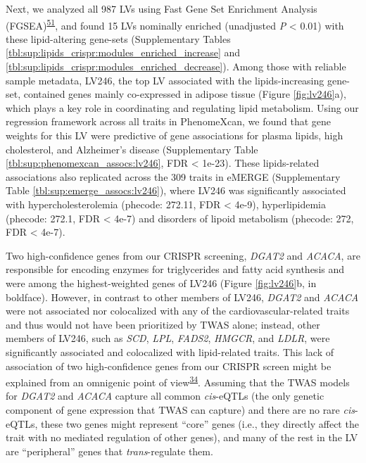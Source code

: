 \documentclass[
  a4paper,
]{article}
\begin{document}
Next, we analyzed all 987 LVs using Fast Gene Set Enrichment Analysis (FGSEA)\textsuperscript{\protect\hyperlink{ref-Z8WXLD67}{51}}, and found 15 LVs nominally enriched (unadjusted \emph{P} \textless{} 0.01) with these lipid-altering gene-sets (Supplementary Tables \ref{tbl:sup:lipids_crispr:modules_enriched_increase} and \ref{tbl:sup:lipids_crispr:modules_enriched_decrease}).
Among those with reliable sample metadata, LV246, the top LV associated with the lipids-increasing gene-set, contained genes mainly co-expressed in adipose tissue (Figure \ref{fig:lv246}a), which plays a key role in coordinating and regulating lipid metabolism.
Using our regression framework across all traits in PhenomeXcan, we found that gene weights for this LV were predictive of gene associations for plasma lipids, high cholesterol, and Alzheimer's disease (Supplementary Table \ref{tbl:sup:phenomexcan_assocs:lv246}, FDR \textless{} 1e-23).
These lipids-related associations also replicated across the 309 traits in eMERGE (Supplementary Table \ref{tbl:sup:emerge_assocs:lv246}), where LV246 was significantly associated with hypercholesterolemia (phecode: 272.11, FDR \textless{} 4e-9), hyperlipidemia (phecode: 272.1, FDR \textless{} 4e-7) and disorders of lipoid metabolism (phecode: 272, FDR \textless{} 4e-7).

Two high-confidence genes from our CRISPR screening, \emph{DGAT2} and \emph{ACACA}, are responsible for encoding enzymes for triglycerides and fatty acid synthesis and were among the highest-weighted genes of LV246 (Figure \ref{fig:lv246}b, in boldface).
However, in contrast to other members of LV246, \emph{DGAT2} and \emph{ACACA} were not associated nor colocalized with any of the cardiovascular-related traits and thus would not have been prioritized by TWAS alone;
instead, other members of LV246, such as \emph{SCD}, \emph{LPL}, \emph{FADS2}, \emph{HMGCR}, and \emph{LDLR}, were significantly associated and colocalized with lipid-related traits.
This lack of association of two high-confidence genes from our CRISPR screen might be explained from an omnigenic point of view\textsuperscript{\protect\hyperlink{ref-LXvTZzEA}{34}}.
Assuming that the TWAS models for \emph{DGAT2} and \emph{ACACA} capture all common \emph{cis}-eQTLs (the only genetic component of gene expression that TWAS can capture) and there are no rare \emph{cis}-eQTLs, these two genes might represent ``core'' genes (i.e., they directly affect the trait with no mediated regulation of other genes), and many of the rest in the LV are ``peripheral'' genes that \emph{trans}-regulate them.
\end{document}
